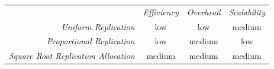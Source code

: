 \begin{center}
\begin{tabular}{rccc}
\multicolumn{1}{r}{} &
\multicolumn{1}{c}{\emph{Efficiency}} &
\multicolumn{1}{c}{\emph{Overhead}} &
\multicolumn{1}{c}{\emph{Scalability}}
\\
\cline{2-4}
\emph{Uniform Replication} &
low &
low &
%
medium \\
\emph{Proportional Replication} &
low &
medium &
%
low \\
\emph{Square Root Replication Allocation} &
medium &
medium &
medium \\
\end{tabular}
\end{center}

